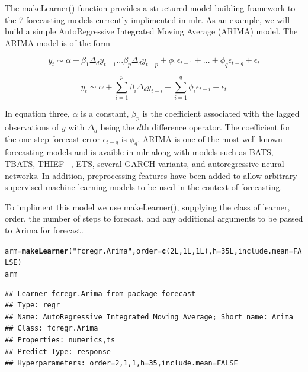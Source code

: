 \documentclass{article}\usepackage[]{graphicx}\usepackage[]{color}
\makeatletter
\newcommand{\hlnum}[1]{\textcolor[rgb]{0.686,0.059,0.569}{#1}}%
\newcommand{\hlstr}[1]{\textcolor[rgb]{0.192,0.494,0.8}{#1}}%
\newcommand{\hlstd}[1]{\textcolor[rgb]{0.345,0.345,0.345}{#1}}%
\newcommand{\hlkwb}[1]{\textcolor[rgb]{0.69,0.353,0.396}{#1}}%
\newcommand{\hlkwc}[1]{\textcolor[rgb]{0.333,0.667,0.333}{#1}}%
\newcommand{\hlkwd}[1]{\textcolor[rgb]{0.737,0.353,0.396}{\textbf{#1}}}%
\newenvironment{kframe}{%
 \def\at@end@of@kframe{}%
 \ifinner\ifhmode%
  \def\at@end@of@kframe{\end{minipage}}%
  \begin{minipage}{\columnwidth}%
 \fi\fi%
 \def\FrameCommand##1{\hskip\@totalleftmargin \hskip-\fboxsep
 \colorbox{shadecolor}{##1}\hskip-\fboxsep
     \hskip-\linewidth \hskip-\@totalleftmargin \hskip\columnwidth}%
 \MakeFramed {\advance\hsize-\width
   \@totalleftmargin\z@ \linewidth\hsize
   \@setminipage}}%
 {\par\unskip\endMakeFramed%
 \at@end@of@kframe}
\newenvironment{knitrout}{}{} %
\theoremstyle{definition}
\newcommand\code{\@codex}
\def\@codex#1{{\normalfont\ttfamily\hyphenchar\font=-1 #1}}
\newcommand{\pkg}[1]{{\fontseries{b}\selectfont #1}}
\makeatother
\begin{document}
The \code{makeLearner()} function provides a structured model building framework to the 7 forecasting models currently implimented in \pkg{mlr}. As an example, we will build a simple AutoRegressive Integrated Moving Average (ARIMA) model. The ARIMA model is of the form

\begin{equation}
y_t \sim \alpha + \beta_1 \Delta_d y_{t-1} ... \beta_p \Delta_d y_{t-p} + \phi_1 \epsilon_{t-1} + ... + \phi_q \epsilon_{t-q} + \epsilon_t
\end{equation}

\begin{equation}
y_t \sim \alpha + \sum_{i=1}^p \beta_i \Delta_d y_{t-i} + \sum_{i=1}^q \phi_i \epsilon_{t-i} +\epsilon_t
\end{equation}

In equation three, $\alpha$ is a constant, $\beta_p$ is the coefficient associated with the lagged observations of $y$ with $\Delta_d$ being the $d$th difference operator. The coefficient for the one step forecast error $\epsilon_{t-q}$ is $\phi_q$. ARIMA is one of the most well known forecasting models and is avaible in mlr along with models such as BATS, TBATS, THIEF ~\cite{thief}, ETS, several GARCH variants, and autoregressive neural networks. In addition, preprocessing features have been added to allow arbitrary supervised machine learning models to be used in the context of forecasting.

To impliment this model we use \code{makeLearner()}, supplying the class of learner, order, the number of steps to forecast, and any additional arguments to be passed to \code{Arima} for \pkg{forecast}. 

\begin{knitrout}
\color{fgcolor}\begin{kframe}
\begin{alltt}
\hlstd{arm} \hlkwb{=} \hlkwd{makeLearner}\hlstd{(}\hlstr{"fcregr.Arima"}\hlstd{,} \hlkwc{order} \hlstd{=} \hlkwd{c}\hlstd{(}\hlnum{2L}\hlstd{,}\hlnum{1L}\hlstd{,}\hlnum{1L}\hlstd{),} \hlkwc{h} \hlstd{=} \hlnum{35L}\hlstd{,} \hlkwc{include.mean} \hlstd{=} \hlnum{FALSE}\hlstd{)}
\hlstd{arm}
\end{alltt}
\begin{verbatim}
## Learner fcregr.Arima from package forecast
## Type: regr
## Name: AutoRegressive Integrated Moving Average; Short name: Arima
## Class: fcregr.Arima
## Properties: numerics,ts
## Predict-Type: response
## Hyperparameters: order=2,1,1,h=35,include.mean=FALSE
\end{verbatim}
\end{kframe}
\end{knitrout}
\end{document}
